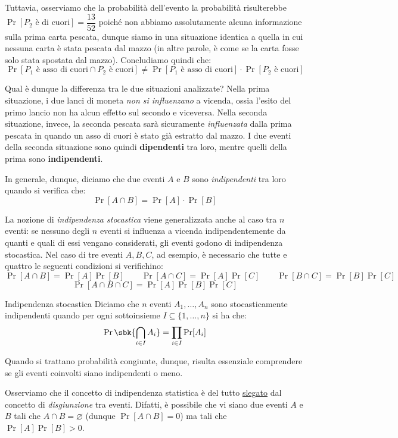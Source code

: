 \documentclass[a4paper, 12pt]{report}
\begin{document}
    Tuttavia, osserviamo che la probabilità dell'evento  la probabilità risulterebbe $\Pr[P_2 \text{ è di cuori}] = \dfrac{13}{52}$ poiché non abbiamo assolutamente alcuna informazione sulla prima carta pescata, dunque siamo in una situazione identica a quella in cui nessuna carta è stata pescata dal mazzo (in altre parole, è come se la carta fosse solo stata spostata dal mazzo). Concludiamo quindi che:
    \[\Pr[P_1\text{ è asso di cuori} \cap P_2 \text{ è cuori}] \neq \Pr[P_1\text{ è asso di cuori}] \cdot \Pr[P_2 \text{ è cuori}] \]

    Qual è dunque la differenza tra le due situazioni analizzate? Nella prima situazione, i due lanci di moneta \textit{non si influenzano} a vicenda, ossia l'esito del primo lancio non ha alcun effetto sul secondo e viceversa. Nella seconda situazione, invece, la seconda pescata sarà sicuramente \textit{influenzata} dalla prima pescata in quando un asso di cuori è stato già estratto dal mazzo. I due eventi della seconda situazione  sono quindi \textbf{dipendenti} tra loro, mentre quelli della prima sono \textbf{indipendenti}.

    In generale, dunque, diciamo che due eventi $A$ e $B$ sono \textit{indipendenti} tra loro quando si verifica che:
    \[\Pr[A \cap B] = \Pr[A] \cdot \Pr[B]\]

    La nozione di \textit{indipendenza stocastica} viene generalizzata anche al caso tra $n$ eventi: se nessuno degli $n$ eventi si influenza a vicenda indipendentemente da quanti e quali di essi vengano considerati, gli eventi godono di indipendenza stocastica. Nel caso di tre eventi $A,B,C$, ad esempio, è necessario che tutte e quattro le seguenti condizioni si verifichino:
    \[\Pr[A \cap B] = \Pr[A] \Pr[B] \qquad \Pr[A \cap C] = \Pr[A] \Pr[C] \qquad \Pr[B \cap C] = \Pr[B] \Pr[C]\]
    \[\Pr[A \cap B \cap C] = \Pr[A] \Pr[B]\Pr[C]\]

    \begin{frameddefn}{Indipendenza stocastica}
        Diciamo che $n$ eventi $A_1, \ldots, A_n$ sono stocasticamente indipendenti quando per ogni sottoinsieme $I \subseteq \{1,\ldots,n\}$ si ha che:
        \[\Pr\sbk{\bigcap_{i \in I} A_i} = \prod_{i \in I} \Pr[A_i]\]
    \end{frameddefn}

    Quando si trattano probabilità congiunte, dunque, risulta essenziale comprendere se gli eventi coinvolti siano indipendenti o meno.
    
    \begin{framedobs}{}
        Osserviamo che il concetto di indipendenza statistica è del tutto \underline{slegato} dal concetto di \textit{disgiunzione} tra eventi. Difatti, è possibile che vi siano due eventi $A$ e $B$ tali che $A \cap B = \varnothing$ (dunque $\Pr[A \cap B] = 0$) ma tali che $\Pr[A] \Pr[B] > 0$.
    \end{framedobs}
\end{document}
